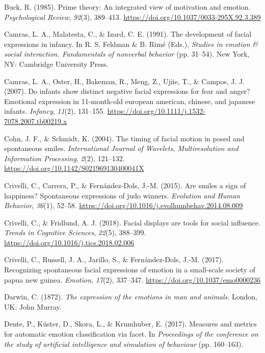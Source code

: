 \documentclass[
  english,
  doc]{apa7}
\newlength{\cslhangindent}
\newenvironment{cslreferences}%
  {\setlength{\parindent}{0pt}%
  \everypar{\setlength{\hangindent}{\cslhangindent}}\ignorespaces}%
  {\par}
\begin{document}
\begin{cslreferences}
\leavevmode\hypertarget{ref-buck1985prime}{}%
Buck, R. (1985). Prime theory: An integrated view of motivation and emotion. \emph{Psychological Review}, \emph{92}(3), 389--413. \url{https://doi.org/10.1037/0033-295X.92.3.389}

\leavevmode\hypertarget{ref-camras1991development}{}%
Camras, L. A., Malatesta, C., \& Izard, C. E. (1991). The development of facial expressions in infancy. In R. S. Feldman \& B. Rimé (Eds.), \emph{Studies in emotion \& social interaction. Fundamentals of nonverbal behavior} (pp. 31--54). New York, NY: Cambridge University Press.

\leavevmode\hypertarget{ref-camras2007infants}{}%
Camras, L. A., Oster, H., Bakeman, R., Meng, Z., Ujiie, T., \& Campos, J. J. (2007). Do infants show distinct negative facial expressions for fear and anger? Emotional expression in 11-month-old european american, chinese, and japanese infants. \emph{Infancy}, \emph{11}(2), 131--155. \url{https://doi.org/10.1111/j.1532-7078.2007.tb00219.x}

\leavevmode\hypertarget{ref-cohn2003timing}{}%
Cohn, J. F., \& Schmidt, K. (2004). The timing of facial motion in posed and spontaneous smiles. \emph{International Journal of Wavelets, Multiresolution and Information Processing}, \emph{2}(2), 121--132. \url{https://doi.org/10.1142/S021969130400041X}

\leavevmode\hypertarget{ref-crivelli2015smiles}{}%
Crivelli, C., Carrera, P., \& Fernández-Dols, J.-M. (2015). Are smiles a sign of happiness? Spontaneous expressions of judo winners. \emph{Evolution and Human Behavior}, \emph{36}(1), 52--58. \url{https://doi.org/10.1016/j.evolhumbehav.2014.08.009}

\leavevmode\hypertarget{ref-crivelli2018facial}{}%
Crivelli, C., \& Fridlund, A. J. (2018). Facial displays are tools for social influence. \emph{Trends in Cognitive Sciences}, \emph{22}(5), 388--399. \url{https://doi.org/10.1016/j.tics.2018.02.006}

\leavevmode\hypertarget{ref-crivelli2017recognizing}{}%
Crivelli, C., Russell, J. A., Jarillo, S., \& Fernández-Dols, J.-M. (2017). Recognizing spontaneous facial expressions of emotion in a small-scale society of papua new guinea. \emph{Emotion}, \emph{17}(2), 337--347. \url{https://doi.org/10.1037/emo0000236}

\leavevmode\hypertarget{ref-darwin1872expression}{}%
Darwin, C. (1872). \emph{The expression of the emotions in man and animals}. London, UK: John Murray.

\leavevmode\hypertarget{ref-dente2017measures}{}%
Dente, P., Küster, D., Skora, L., \& Krumhuber, E. (2017). Measures and metrics for automatic emotion classification via facet. In \emph{Proceedings of the conference on the study of artificial intelligence and simulation of behaviour} (pp. 160--163).


\end{cslreferences}
\end{document}
